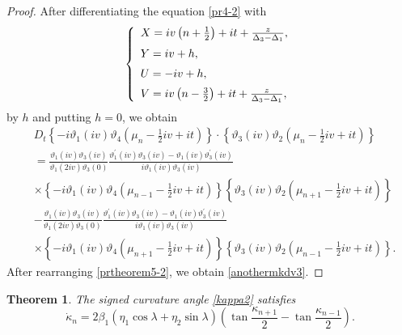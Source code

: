 \documentclass[10pt,leqno]{amsart}
\newtheorem{theorem}{Theorem}[section]
\numberwithin{equation}{section}
\begin{document}
\begin{proof}
After differentiating the equation \eqref{pr4-2} with
\begin{eqnarray}\label{prtheorem5-1}
\left\{
\begin{array}{l}
\vspace{2mm}
X=iv\left(n+\frac{1}{2}\right)+it+\frac{z}{\Delta_{3}-\Delta_{1}},\\
\vspace{2mm}
Y=iv+h,\\
\vspace{2mm}
U=-iv+h,\\
V=iv\left(n-\frac{3}{2}\right)+it+\frac{z}{\Delta_{3}-\Delta_{1}},\\
\end{array}
\right.
\end{eqnarray}
by $h$ and putting $h=0$, we obtain
\begin{equation}\label{prtheorem5-2}
\begin{split}
&D_{t} \left\{-i\vartheta_1(iv)\vartheta_4\left(\mu_{n}-\frac{1}{2}iv+it\right)\right\} \cdot \left\{ \vartheta_3(iv)\vartheta_2\left(\mu_{n}-\frac{1}{2}iv+it\right)\right\} \\
&=\frac{\vartheta_1(iv)\vartheta_3(iv)}{\vartheta_1(2iv)\vartheta_3(0)} \frac{\vartheta^{'}_{1}\left(iv\right)\vartheta_{3}\left(iv\right)-\vartheta_{1}\left(iv\right)\vartheta^{'}_{3}\left(iv\right)}{i\vartheta_{1}\left(iv\right)\vartheta_{3}\left(iv\right)}\\
&\times \left\{-i\vartheta_1(iv)\vartheta_4\left(\mu_{n-1}-\frac{1}{2}iv+it\right)\right\} \left\{ \vartheta_3(iv)\vartheta_2\left(\mu_{n+1}-\frac{1}{2}iv+it\right)\right\}\\
&-\frac{\vartheta_1(iv)\vartheta_3(iv)}{\vartheta_1(2iv)\vartheta_3(0)}\frac{\vartheta^{'}_{1}\left(iv\right)\vartheta_{3}\left(iv\right)-\vartheta_{1}\left(iv\right)\vartheta^{'}_{3}\left(iv\right)}{i\vartheta_{1}\left(iv\right)\vartheta_{3}\left(iv\right)}\\
&\times \left\{-i\vartheta_1(iv)\vartheta_4\left(\mu_{n+1}-\frac{1}{2}iv+it\right)\right\} \left\{ \vartheta_3(iv)\vartheta_2\left(\mu_{n-1}-\frac{1}{2}iv+it\right)\right\}.
\end{split}
\end{equation}
After rearranging \eqref{prtheorem5-2}, we obtain \eqref{anothermkdv3}.
\end{proof}
\begin{theorem}\label{thm:anothermkdv}
The signed curvature angle \eqref{kappa2} satisfies
\begin{equation}\label{anothermkdv}
\dot\kappa_{n}=2\beta_{1}\left(\eta_{1}\cos\lambda+\eta_{2}\sin\lambda\right)\left(\tan\frac{\kappa_{n+1}}{2}-\tan\frac{\kappa_{n-1}}{2}\right).
\end{equation}
\end{theorem}
\end{document}
